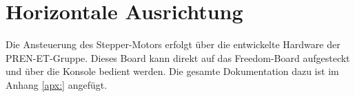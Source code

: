 \section{Horizontale Ausrichtung}
    Die Ansteuerung des Stepper-Motors erfolgt über die entwickelte Hardware der PREN-ET-Gruppe. Dieses Board kann direkt auf das Freedom-Board aufgesteckt und über die Konsole bedient werden. Die gesamte Dokumentation dazu ist im Anhang \ref{apx:} angefügt.